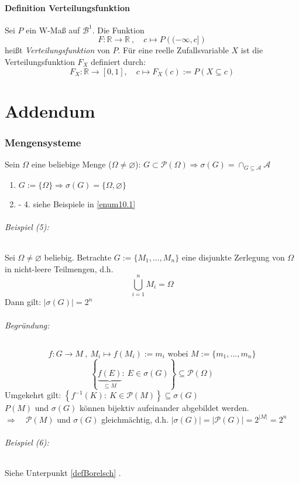 \documentclass[12pt,a4paper]{article}
\begin{document}
	\subsection{Definition Verteilungsfunktion}
	Sei $P$ ein W-Maß auf $\mathcal{B}^1$. Die Funktion 
	$$F:\mathbb{R}\rightarrow\mathbb{R} \: , \quad c\longmapsto P\left((-\infty,c]\right)$$
	heißt \textit{Verteilungsfunktion} von $P$. Für eine reelle Zufallsvariable $X$ ist die Verteilungsfunktion $F_X$ definiert durch:
	$$F_X:\mathbb{R}\rightarrow[0,1], \quad c\longmapsto F_X(c):=P(X\subseteq c)$$
	
	
	
	
	
	
	\pagebreak
	
	\part{Addendum}
	
	\section*{Mengensysteme}
	Sein $\Omega$ eine beliebige Menge ($\Omega \neq \varnothing$): $\displaystyle G\subset \mathcal{P}(\Omega) \Rightarrow \sigma(G) = \cap_{G\subseteq \mathcal{A}} \mathcal{A}$
	\begin{enumerate}
		\item $\displaystyle G:=\{ \Omega \} \Rightarrow \sigma(G)=\{\Omega ,\varnothing\}$
		\item - 4. siehe Beispiele in \ref{enum10.1} 
	\end{enumerate}
	\paragraph{Beispiel (5):}
	Sei $\Omega\neq\varnothing$ beliebig. Betrachte $G:=\{ M_1 , ..., M_n\}$ eine disjunkte Zerlegung von $\Omega$ in nicht-leere Teilmengen, d.h.
	$$\bigcup_{i=1}^n M_i = \Omega$$
	Dann gilt: $\displaystyle \left| \sigma(G)\right| = 2^n$
	\paragraph{Begründung:}
	$$f:G \rightarrow M \: , \: M_i \longmapsto f(M_i):=m_i \text{ wobei } M:=\{m_1,...,m_n\}$$
	$$\left\{\underbrace{f(E)}_{\subseteq M} : \: E\in\sigma (G)\right\} \subseteq \mathcal P(\Omega)$$	
	Umgekehrt gilt: $\displaystyle \left\{f^{-1}(K): \: K\in\mathcal{P}(M)\right\}\subseteq \sigma(G)$ \\
	$P(M)$ und $\sigma(G)$ können bijektiv aufeinander abgebildet werden. \\
	$\Rightarrow \quad \mathcal{P}(M)$ und $\sigma (G)$ gleichmächtig, d.h. $|\sigma (G)|=|\mathcal{P}(G)|=2^{|M|}=2^n$
	\paragraph{Beispiel (6):}	
	Siehe Unterpunkt \ref{defBorelsch} .
	
	
	
	
\end{document}
